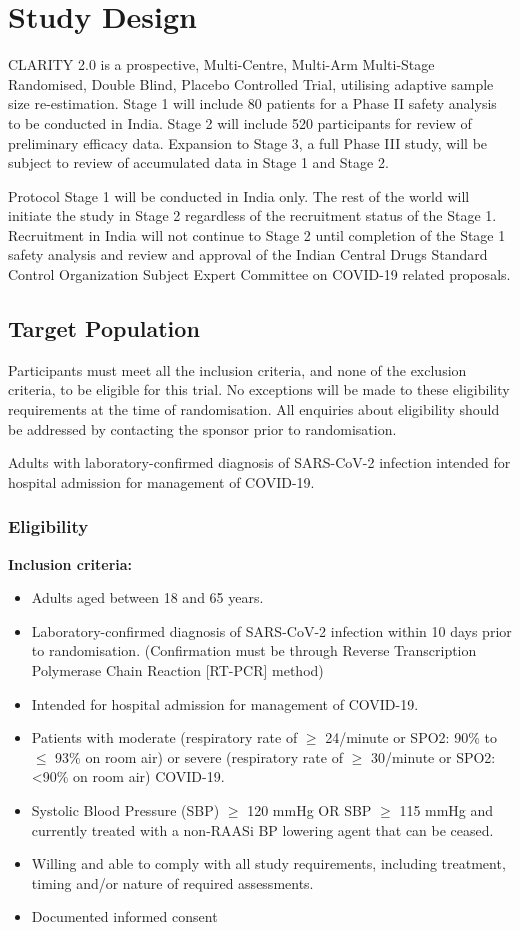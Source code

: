 \documentclass[11pt,parskip=half-]{scrartcl}
\begin{document}
\section{Study Design}
CLARITY 2.0 is a prospective, Multi-Centre, Multi-Arm Multi-Stage Randomised, Double Blind, Placebo Controlled Trial, utilising adaptive sample size re-estimation. Stage 1 will include 80 patients for a Phase II safety analysis to be conducted in India. Stage 2 will include 520 participants for review of preliminary efficacy data. Expansion to Stage 3, a full Phase III study, will be subject to review of accumulated data in Stage 1 and Stage 2.

Protocol Stage 1 will be conducted in India only. The rest of the world will initiate the study in Stage 2 regardless of the recruitment status of the Stage 1. Recruitment in India will not continue to Stage 2 until completion of the Stage 1 safety analysis and review and approval of the Indian Central Drugs Standard Control Organization Subject Expert Committee on COVID-19 related proposals.


\subsection{Target Population}
Participants must meet all the inclusion criteria, and none of the exclusion criteria, to be eligible for this trial. No exceptions will be made to these eligibility requirements at the time of randomisation. All enquiries about eligibility should be addressed by contacting the sponsor prior to randomisation.

Adults with laboratory-confirmed diagnosis of SARS-CoV-2 infection intended for hospital admission for management of COVID-19.

\subsubsection{Eligibility}
\textbf{Inclusion criteria:}
\begin{itemize}
    \item Adults aged between 18 and 65 years.
    \item Laboratory-confirmed diagnosis of SARS-CoV-2 infection within 10 days prior to randomisation. (Confirmation must be through Reverse Transcription Polymerase Chain Reaction [RT-PCR] method)
    \item Intended for hospital admission for management of COVID-19.
    \item  Patients with moderate (respiratory rate of $\geq$ 24/minute or SPO2: 90\% to $\leq$ 93\% on room air) or severe (respiratory rate of $\geq$ 30/minute or SPO2: <90\% on room air) COVID-19.
    \item  Systolic Blood Pressure (SBP) $\geq$ 120 mmHg OR SBP $\geq$ 115 mmHg and currently treated with a non-RAASi BP lowering agent that can be ceased.
    \item Willing and able to comply with all study requirements, including treatment, timing and/or nature of required assessments.
    \item Documented informed consent
\end{itemize}
\end{document}
